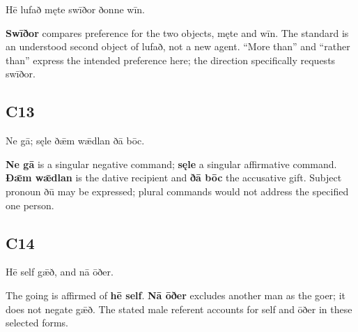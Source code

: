 \par\begin{minipage}{\linewidth}\raggedright
Hē lufað męte swīðor ðonne wīn.

\textbf{Swīðor} compares preference for the two objects, męte and wīn. The standard is an understood second object of lufað, not a new agent. “More than” and “rather than” express the intended preference here; the direction specifically requests swīðor.

\end{minipage}\par\addvspace{4pt}

\subsection*{C13}

\par\begin{minipage}{\linewidth}\raggedright
Ne gā; sęle ðǣm wǣdlan ðā bōc.

\textbf{Ne gā} is a singular negative command; \textbf{sęle} a singular affirmative command. \textbf{Ðǣm wǣdlan} is the dative recipient and \textbf{ðā bōc} the accusative gift. Subject pronoun ðū may be expressed; plural commands would not address the specified one person.

\end{minipage}\par\addvspace{4pt}

\subsection*{C14}

\par\begin{minipage}{\linewidth}\raggedright
Hē self gǣð, and nā ōðer.

The going is affirmed of \textbf{hē self}. \textbf{Nā ōðer} excludes another man as the goer; it does not negate gǣð. The stated male referent accounts for self and ōðer in these selected forms.

\end{minipage}\par\addvspace{4pt}

